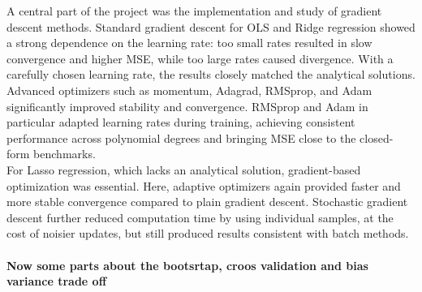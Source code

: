 \documentclass[
    article
 reprint,            %
 amsmath,amssymb,
 aps,
]{revtex4-2}
\begin{document}
A central part of the project was the implementation and study of gradient descent methods.
Standard gradient descent for OLS and Ridge regression showed a strong dependence on the learning rate: too small rates resulted in slow convergence and higher MSE, while too large rates caused divergence.
With a carefully chosen learning rate, the results closely matched the analytical solutions.
Advanced optimizers such as momentum, Adagrad, RMSprop, and Adam significantly improved stability and convergence.
RMSprop and Adam in particular adapted learning rates during training, achieving consistent performance across polynomial degrees and bringing MSE close to the closed-form benchmarks.\\
For Lasso regression, which lacks an analytical solution, gradient-based optimization was essential.
Here, adaptive optimizers again provided faster and more stable convergence compared to plain gradient descent.
Stochastic gradient descent further reduced computation time by using individual samples, at the cost of noisier updates, but still produced results consistent with batch methods.\\\\

\textbf{Now some parts about the bootsrtap, croos validation and bias variance trade off}



\end{document}
